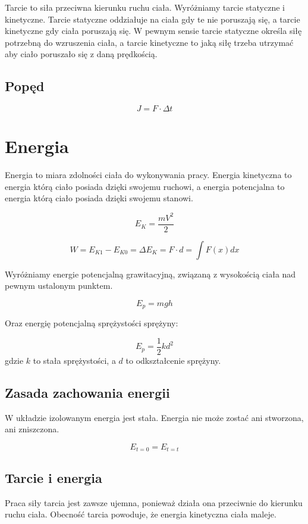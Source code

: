 \documentclass{../notatki}
\begin{document}
Tarcie to siła przeciwna kierunku ruchu ciała. Wyróżniamy tarcie statyczne i
kinetyczne. Tarcie statyczne oddziałuje na ciała gdy te nie poruszają się, a
tarcie kinetyczne gdy ciała poruszają się. W pewnym sensie tarcie statyczne
określa siłę potrzebną do wzruszenia ciała, a tarcie kinetyczne to jaką siłę
trzeba utrzymać aby ciało poruszało się z daną prędkością.

\subsection{Popęd}

$$
J = F \cdot \Delta t
$$

\section{Energia}

Energia to miara zdolności ciała do wykonywania pracy. Energia kinetyczna to
energia którą ciało posiada dzięki swojemu ruchowi, a energia potencjalna to
energia którą ciało posiada dzięki swojemu stanowi.

$$
E_K = \frac{mV^2}{2}
$$

$$
W = E_{K1} - E_{K0} = \Delta E_K = F \cdot d = \int F(x) dx
$$

Wyróżniamy energie potencjalną grawitacyjną, związaną z wysokością ciała nad
pewnym ustalonym punktem.

$$
E_p = mgh
$$

Oraz energię potencjalną sprężystości sprężyny:

$$
E_p = \frac{1}{2}kd^2
$$
gdzie $k$ to stała sprężystości, a $d$ to odkształcenie sprężyny.

\subsection{Zasada zachowania energii}

W układzie izolowanym energia jest stała. Energia nie może zostać ani stworzona,
ani zniszczona.

$$
E_{t=0} = E_{t=t}
$$

\subsection{Tarcie i energia}

Praca siły tarcia jest zawsze ujemna, ponieważ działa ona przeciwnie do kierunku
ruchu ciała. Obecność tarcia powoduje, że energia kinetyczna ciała maleje.
\end{document}
